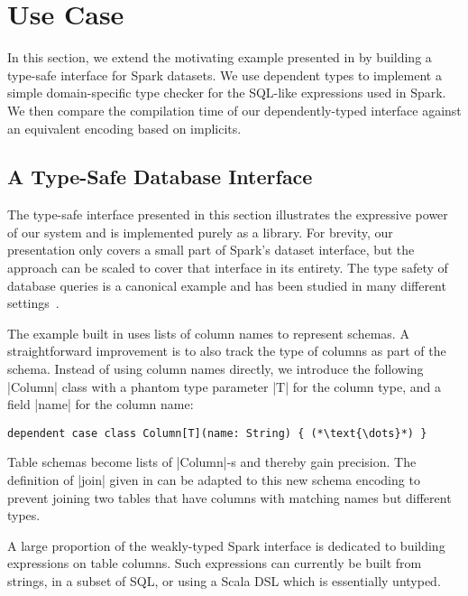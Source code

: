 \section{Use Case}
\label{sec:use-case}

In this section, we extend the motivating example presented in  by building a type-safe interface for Spark datasets.
We use dependent types to implement a simple domain-specific type checker for the SQL-like expressions used in Spark.
We then compare the compilation time of our dependently-typed interface against an equivalent encoding based on implicits.

\subsection{A Type-Safe Database Interface}

The type-safe interface presented in this section illustrates the expressive power of our system and is implemented purely as a library.
For brevity, our presentation only covers a small part of Spark's dataset interface, but the approach can be scaled to cover that interface in its entirety.
The type safety of database queries is a canonical example and has been studied in many different settings~\citep{leijen1999domain, kazerounian2019type, meijer2006linq, chlipala2010ur}.

The example built in  uses lists of column names to represent schemas.
A straightforward improvement is to also track the type of columns as part of the schema.
Instead of using column names directly, we introduce the following |Column| class with a phantom type parameter |T| for the column type, and a field |name| for the column name:

\begin{lstlisting}
dependent case class Column[T](name: String) { (*\text{\dots}*) }
\end{lstlisting}

Table schemas become lists of |Column|-s and thereby gain precision.
The definition of |join| given in  can be adapted to this new schema encoding to prevent joining two tables that have columns with matching names but different types.

A large proportion of the weakly-typed Spark interface is dedicated to building expressions on table columns.
Such expressions can currently be built from strings, in a subset of SQL, or using a Scala DSL which is essentially untyped.

